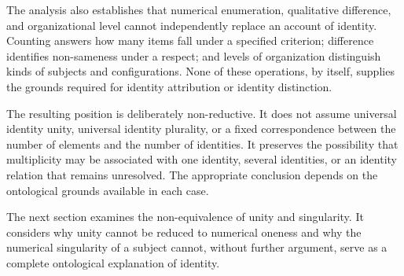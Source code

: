 The analysis also establishes that numerical
enumeration, qualitative difference, and
organizational level cannot independently
replace an account of identity. Counting
answers how many items fall under a specified
criterion; difference identifies non-sameness
under a respect; and levels of organization
distinguish kinds of subjects and configurations.
None of these operations, by itself, supplies
the grounds required for identity attribution
or identity distinction.

The resulting position is deliberately
non-reductive. It does not assume universal
identity unity, universal identity plurality,
or a fixed correspondence between the
number of elements and the number of
identities. It preserves the possibility
that multiplicity may be associated with
one identity, several identities, or an
identity relation that remains unresolved.
The appropriate conclusion depends on
the ontological grounds available in each
case.

The next section examines the non-equivalence
of unity and singularity. It considers why
unity cannot be reduced to numerical
oneness and why the numerical singularity
of a subject cannot, without further
argument, serve as a complete ontological
explanation of identity.

